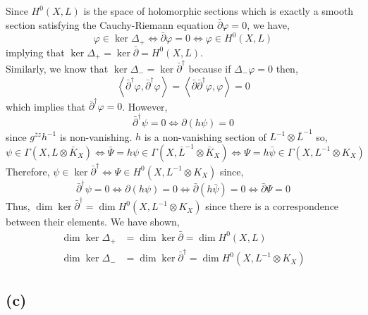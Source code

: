 \documentclass[12pt]{extarticle}
\newcommand{\inner}[2]{\left< #1, #2 \right>}
\theoremstyle{definition}
\begin{document}
Since $H^0(X, L)$ is the space of holomorphic sections which is exactly a smooth section satisfying the Cauchy-Riemann equation $\bar{\partial} \varphi = 0$, we have,
\[ \varphi \in \ker{\Delta_{+}} \iff \bar{\partial} \varphi = 0 \iff \varphi \in H^0(X, L) \]
implying that  $\ker{\Delta_{+}} = \ker{\bar{\partial}} = H^0(X, L)$. 
\bigskip\\
Similarly, we know that $\ker{\Delta_{-}} = \ker{\bar{\partial}^\dagger}$ because if $\Delta_{-} \varphi = 0$ then,
\[ \inner{\bar{\partial}^\dagger \varphi}{\bar{\partial}^\dagger \varphi} = \inner{\bar{\partial} \bar{\partial}^\dagger \varphi}{\varphi} = 0 \]
which implies that $\bar{\partial}^\dagger \varphi = 0$.
However,
\[ \bar{\partial}^\dagger \psi = 0 \iff \partial (h \psi) = 0 \]
since $g^{\bar{z} z} h^{-1}$ is non-vanishing. $h$ is a non-vanishing section of $L^{-1} \otimes \bar{L}^{-1}$ so,
\[ \psi \in \Gamma(X, L \otimes \bar{K}_X) \iff \bar{\Psi} = h \psi \in \Gamma(X, \bar{L}^{-1} \otimes \bar{K}_X) \iff \Psi = h \bar{\psi} \in \Gamma(X, L^{-1} \otimes K_X) \]
Therefore, $\psi \in \ker{\bar{\partial}^\dagger} \iff \Psi \in H^0(X, L^{-1} \otimes K_X)$ since,
\[ \bar{\partial}^\dagger \psi = 0 \iff \partial (h \psi) = 0 \iff \bar{\partial} (h \bar{\psi}) = 0 \iff \bar{\partial} \Psi = 0 \]
Thus, $\dim{\ker{\bar{\partial}^\dagger}} = \dim{H^0(X, L^{-1} \otimes K_X)}$ since there is a correspondence between their elements. 
We have shown,
\begin{align*}
\dim{\ker{\Delta_{+}}} & = \dim{\ker{\bar{\partial}}} = \dim{H^0(X, L)}
\\
\dim{\ker{\Delta_{-}}} & = \dim{\ker{\bar{\partial}^\dagger}} = \dim{H^0(X, L^{-1} \otimes K_X)}
\end{align*}

\subsection*{(c)}
\end{document}
